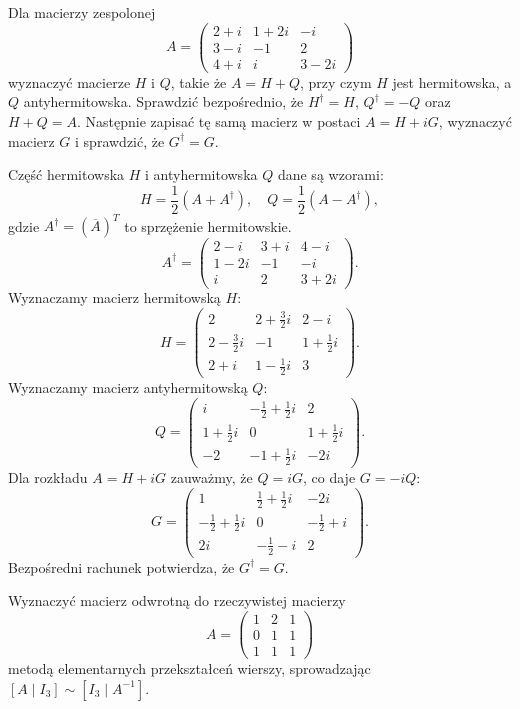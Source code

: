 \documentclass[11pt,a4paper]{article}
\newenvironment{zadanie}[1]{%
    \begin{tcolorbox}[title={Zadanie #1}, colbacktitle=TitleBg]
}{%
    \end{tcolorbox}\vspace{0.3cm}%
}
\newenvironment{rozwiazanie}{%
    \par\noindent{\color{AccentColor}\textbf{\textsf{Rozwiązanie:}}}\par\smallskip
}{%
    \vspace{0.4cm}{\color{MainColor}\hrule height 0.5pt}\vspace{0.3cm}
}
\begin{document}
\begin{zadanie}{2}
Dla macierzy zespolonej
\[
A = \begin{pmatrix} 2+i & 1+2i & -i \\ 3-i & -1 & 2 \\ 4+i & i & 3-2i \end{pmatrix}
\]
wyznaczyć macierze $H$ i $Q$, takie że $A=H+Q$, przy czym $H$ jest hermitowska, a $Q$ antyhermitowska. Sprawdzić bezpośrednio, że $H^\dagger = H$, $Q^\dagger = -Q$ oraz $H+Q=A$. Następnie zapisać tę samą macierz w postaci $A=H+iG$, wyznaczyć macierz $G$ i sprawdzić, że $G^\dagger = G$.
\end{zadanie}

\begin{rozwiazanie}
Część hermitowska $H$ i antyhermitowska $Q$ dane są wzorami:
\[
H = \frac{1}{2}(A + A^\dagger), \quad Q = \frac{1}{2}(A - A^\dagger),
\]
gdzie $A^\dagger = (\overline{A})^T$ to sprzężenie hermitowskie.
\[
A^\dagger = \begin{pmatrix} 2-i & 3+i & 4-i \\ 1-2i & -1 & -i \\ i & 2 & 3+2i \end{pmatrix}.
\]
Wyznaczamy macierz hermitowską $H$:
\[
H = \begin{pmatrix} 2 & 2+\frac{3}{2}i & 2-i \\ 2-\frac{3}{2}i & -1 & 1+\frac{1}{2}i \\ 2+i & 1-\frac{1}{2}i & 3 \end{pmatrix}.
\]
Wyznaczamy macierz antyhermitowską $Q$:
\[
Q = \begin{pmatrix} i & -\frac{1}{2}+\frac{1}{2}i & 2 \\ 1+\frac{1}{2}i & 0 & 1+\frac{1}{2}i \\ -2 & -1+\frac{1}{2}i & -2i \end{pmatrix}.
\]
Dla rozkładu $A = H + iG$ zauważmy, że $Q = iG$, co daje $G = -iQ$:
\[
G = \begin{pmatrix} 1 & \frac{1}{2}+\frac{1}{2}i & -2i \\ -\frac{1}{2}+\frac{1}{2}i & 0 & -\frac{1}{2}+i \\ 2i & -\frac{1}{2}-i & 2 \end{pmatrix}.
\]
Bezpośredni rachunek potwierdza, że $G^\dagger = G$.
\end{rozwiazanie}

\begin{zadanie}{3}
Wyznaczyć macierz odwrotną do rzeczywistej macierzy
\[
A = \begin{pmatrix} 1 & 2 & 1 \\ 0 & 1 & 1 \\ 1 & 1 & 1 \end{pmatrix}
\]
metodą elementarnych przekształceń wierszy, sprowadzając $[A \mid I_3] \sim [I_3 \mid A^{-1}]$.
\end{zadanie}
\end{document}
